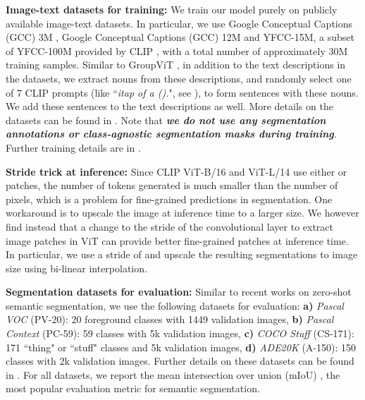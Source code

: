 \documentclass[10pt,twocolumn,letterpaper]{article}
\begin{document}
\textbf{Image-text datasets for training:} We train our model purely on publicly available image-text datasets. In particular, we use Google Conceptual Captions (GCC) 3M \cite{sharma2018conceptual}, Google Conceptual Captions (GCC) 12M \cite{changpinyo2021cc12m} and YFCC-15M, a subset of YFCC-100M \cite{thomee2016yfcc100m} provided by CLIP \cite{radford2021learning}, with a total number of approximately 30M training samples. Similar to GroupViT \cite{xu2022groupvit}, in addition to the text descriptions in the datasets, we extract nouns from these descriptions, and randomly select one of 7 CLIP prompts (like ``\emph{itap of a ().}", see ), to form sentences with these nouns. We add these sentences to the text descriptions as well. More details on the datasets can be found in . Note that \textbf{\emph{we do not use any segmentation annotations or class-agnostic segmentation masks during training}}. Further training details are in .

\textbf{Stride trick at inference:} Since CLIP ViT-B/16 and ViT-L/14 use either  or  patches, the number of tokens generated is much smaller than the number of pixels, which is a problem for fine-grained predictions in segmentation. One workaround is to upscale the image at inference time to a larger size. We however find instead that a change to the stride of the convolutional layer to extract image patches in ViT can provide better fine-grained patches at inference time. In particular, we use a stride of  and upscale the resulting segmentations to image size using bi-linear interpolation.





\textbf{Segmentation datasets for evaluation: } Similar to recent works \cite{xu2022groupvit, ghiasi2021open} on zero-shot semantic segmentation, we use the following datasets for evaluation: \textbf{a)} \emph{Pascal VOC} \cite{Everingham10} (PV-20): 20 foreground classes with 1449 validation images, \textbf{b)} \emph{Pascal Context} \cite{mottaghi_cvpr14} (PC-59): 59 classes with 5k validation images, \textbf{c)} \emph{COCO Stuff} \cite{caesar2018coco} (CS-171): 171 ``thing" or ``stuff" classes and 5k validation images, \textbf{d)} \emph{ADE20K} \cite{zhou2017scene} (A-150): 150 classes with 2k validation images. Further details on these datasets can be found in . For all datasets, we report the mean intersection over union (mIoU) \cite{Everingham10}, the most popular evaluation metric for semantic segmentation.
\end{document}
